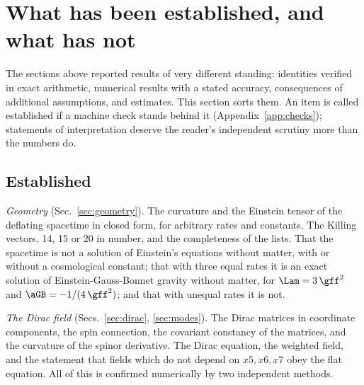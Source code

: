 \section{What has been established, and what has not}
\label{sec:status}

The sections above reported results of very different standing: identities verified in exact
arithmetic, numerical results with a stated accuracy, consequences of additional assumptions, and
estimates. This section sorts them. An item is called established if a machine check stands behind
it (Appendix~\ref{app:checks}); statements of interpretation deserve the reader's independent
scrutiny more than the numbers do.

\subsection{Established}

\emph{Geometry} (Sec.~\ref{sec:geometry}). The curvature and the Einstein tensor of the deflating
spacetime in closed form, for arbitrary rates and constants. The Killing vectors, 14, 15 or 20 in
number, and the completeness of the lists. That the spacetime is not a solution of Einstein's
equations without matter, with or without a cosmological constant; that with three equal rates it is
an exact solution of Einstein-Gauss-Bonnet gravity without matter, for $\Lam=3\,\gff^{2}$ and
$\aGB=-1/(4\,\gff^{2})$; and that with unequal rates it is not.

\emph{The Dirac field} (Secs.~\ref{sec:dirac}, \ref{sec:modes}). The Dirac matrices in coordinate
components, the spin connection, the covariant constancy of the matrices, and the curvature of the
spinor derivative. The Dirac equation, the weighted field, and the statement that fields which do
not depend on $x5,x6,x7$ obey the flat equation.
 All of this is confirmed
numerically by two independent methods.

